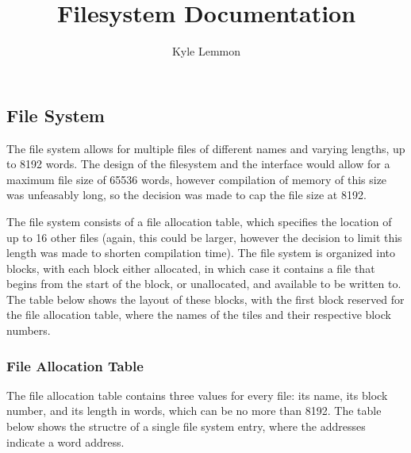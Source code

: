 \documentclass[../ProjectDocumentation.tex]{subfiles}
\title{\textbf{Filesystem Documentation}}
\author{Kyle Lemmon}
\date{}
\begin{document}
\maketitle

\subsection{File System}
The file system allows for multiple files of different names and varying lengths, up to 8192 words. The design of the filesystem and the interface would allow for a maximum file size of 65536 words, however compilation of memory of this size was unfeasably long, so the decision was made to cap the file size at 8192.

The file system consists of a file allocation table, which specifies the location of up to 16 other files (again, this could be larger, however the decision to limit this length was made to shorten compilation time). The file system is organized into blocks, with each block either allocated, in which case it contains a file that begins from the start of the block, or unallocated, and available to be written to. The table below shows the layout of these blocks, with the first block reserved for the file allocation table, where the names of the tiles and their respective block numbers.



\subsubsection{File Allocation Table}
The file allocation table contains three values for every file: its name, its block number, and its length in words, which can be no more than 8192. The table below shows the structre of a single file system entry, where the addresses indicate a word address.
\end{document}
